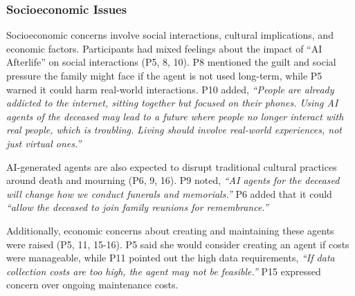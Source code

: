 \subsubsection{Socioeconomic Issues}
Socioeconomic concerns involve social interactions, cultural implications, and economic factors. Participants had mixed feelings about the impact of ``AI Afterlife'' on social interactions (P5, 8, 10). P8 mentioned the guilt and social pressure the family might face if the agent is not used long-term, while P5 warned it could harm real-world interactions. P10 added, \textit{``People are already addicted to the internet, sitting together but focused on their phones. Using AI agents of the deceased may lead to a future where people no longer interact with real people, which is troubling. Living should involve real-world experiences, not just virtual ones.''}

AI-generated agents are also expected to disrupt traditional cultural practices around death and mourning (P6, 9, 16). P9 noted, \textit{``AI agents for the deceased will change how we conduct funerals and memorials.''} P6 added that it could \textit{``allow the deceased to join family reunions for remembrance.''}

Additionally, economic concerns about creating and maintaining these agents were raised (P5, 11, 15-16). P5 said she would consider creating an agent if costs were manageable, while P11 pointed out the high data requirements, \textit{``If data collection costs are too high, the agent may not be feasible.''} P15 expressed concern over ongoing maintenance costs.